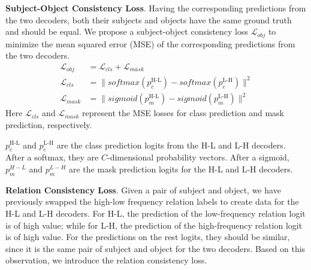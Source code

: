\noindent \textbf{Subject-Object Consistency Loss}.
Having the corresponding predictions from the two decoders, both their subjects and objects have the same ground truth and should be equal. We propose a subject-object consistency loss $\mathcal L_{obj}$ to minimize the mean squared error (MSE) of the corresponding predictions from the two decoders.
\begin{align}
\mathcal L_{obj} &= \mathcal L_{cls} + \mathcal L_{mask} \\
\mathcal L_{cls} &= \lVert softmax(p_{c}^\text{H-L}) - softmax(p_{c}^\text{L-H}) \rVert^2 \\
\mathcal L_{mask} &= \lVert sigmoid(p_{m}^\text{H-L}) - sigmoid(p_{m}^\text{L-H}) \rVert^2
\end{align}
Here $\mathcal L_{cls}$ and $\mathcal L_{mask}$ represent the MSE losses for class prediction and mask prediction, respectively.

$p_{c}^\text{H-L}$ and $p_{c}^\text{L-H}$ are the class prediction logits from the H-L and L-H decoders. After a softmax, they are $C$-dimensional probability vectors. After a sigmoid, $p_{m}^{H-L}$ and $p_{m}^{L-H}$ are the mask prediction logits for the H-L and L-H decoders.  

\noindent \textbf{Relation Consistency Loss}.
Given a pair of subject and object, 
we have previously swapped the high-low frequency relation labels to create data for the H-L and L-H decoders. For H-L, the prediction of the low-frequency relation logit is of high value; while for L-H, the prediction of the high-frequency relation logit is of high value. For the predictions on the rest logits, they should be similar, since it is the same pair of subject and object for the two decoders. Based on this observation, we introduce the relation consistency loss.

